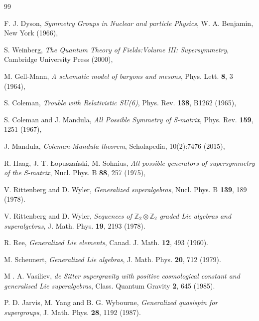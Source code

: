 \documentclass[a4paper,12pt]{article}
\theoremstyle{plain}
\theoremstyle{definition}
\begin{document}
\begin{thebibliography}{99}

 F. J. Dyson, \textit{Symmetry Groups in Nuclear and particle Physics}, W. A. Benjamin, New York (1966),

 S. Weinberg, \textit{The Quantum Theory of Fields:Volume III: Supersymmetry}, Cambridge University Press (2000),

 M. Gell-Mann, \textit{A schematic model of baryons and mesons}, Phys. Lett. {\bf 8}, 3 (1964),

 S. Coleman, \textit{Trouble with Relativistic SU(6)}, Phys. Rev. {\bf 138}, B1262 (1965),

 S. Coleman and J. Mandula, \textit{All Possible Symmetry of S-matrix}, Phys. Rev. {\bf 159}, 1251 (1967),

 J. Mandula, \textit{Coleman-Mandula theorem}, Scholapedia, 10(2):7476 (2015),

 R. Haag, J. T. \L opusza\'nski, M. Sohnius,
\textit{All possible generators of supersymmetry of the S-matrix}, 
Nucl. Phys. B {\bf 88}, 257 (1975),

 V. Rittenberg and D. Wyler, {\it  Generalized superalgebras}, Nucl. Phys. B {\bf 139}, 189 (1978).

 V. Rittenberg and D. Wyler, {\it Sequences of $\mathbb{Z}_2 \otimes \mathbb{Z}_2$ graded Lie algebras and superalgebras}, 
J. Math. Phys. {\bf 19}, 2193  (1978).

 R. Ree, 
\textit{Generalized Lie elements}, Canad. J. Math. \textbf{12}, 493 (1960).

 M. Scheunert, \textit{Generalized Lie algebras}, J. Math. Phys. {\bf 20}, 712 (1979).

 M . A. Vasiliev, \textit{de Sitter supergravity with positive cosmological constant and generalised Lie superalgebras}, Class. Quantum Gravity \textbf{2}, 645 (1985).

 P. D. Jarvis, M. Yang and B. G. Wybourne, 
\textit{Generalized quasispin for supergroups},  J. Math. Phys. {\bf 28},  1192 (1987).


\end{thebibliography}
\end{document}
